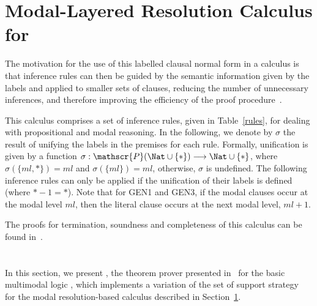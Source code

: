 \begin{example}
    
\end{example}

\section{Modal-Layered Resolution Calculus for }%
\label{sec:calculus}

The motivation for the use of this labelled clausal normal form in a calculus is
that inference rules can then be guided by the semantic information given by the
labels and applied to smaller sets of clauses, reducing the number of
unnecessary inferences, and therefore improving the efficiency of the proof
procedure~\cite{Nalon2016}. 

This calculus comprises a set of inference rules, given in Table~\ref{rules},
for dealing with propositional and modal reasoning. In the following, we denote
by $\sigma$ the result of unifying the labels in the premises for each rule.
Formally, unification is given by a function $ \sigma : \mathscr{P}(\Nat \cup
\{*\}) \longrightarrow \Nat \cup \{*\}$, where $\sigma (\{ml, *\}) = ml$ and
$\sigma (\{ml\}) = ml$, otherwise, $\sigma$ is undefined. The following
inference rules can only be applied if the unification of their labels is
defined (where $* - 1 = *$). Note that for GEN1 and GEN3, if the
modal clauses occur at the modal level $ml$, then the literal clause occurs at
the next modal level, $ml + 1$.

The proofs for termination, soundness and completeness of this calculus can be
found in~\cite{nalon2015modal}.



\section{\ksp}
In this section, we present \ksp, the theorem prover presented
in~\cite{Nalon2016} for the basic multimodal logic , which
implements a variation of the set of support strategy~\cite{wos1965efficiency}
for the modal resolution-based calculus described in Section~\ref{sec:calculus}.
